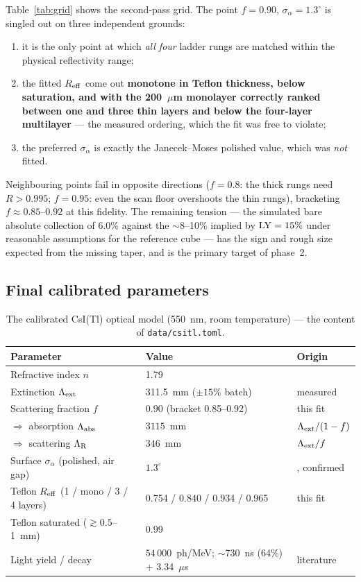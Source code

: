 \documentclass[11pt,a4paper]{article}
\newcommand{\csitl}{CsI(Tl)}
\newcommand{\lext}{\Lambda_{\rm ext}}
\newcommand{\labs}{\Lambda_{\rm abs}}
\newcommand{\lray}{\Lambda_{\rm R}}
\newcommand{\sa}{\sigma_\alpha}
\begin{document}
Table~\ref{tab:grid} shows the second-pass grid. The point $f = 0.90$,
$\sa = 1.3^\circ$ is singled out on three independent grounds:
\begin{enumerate}
  \item it is the only point at which \emph{all four} ladder rungs are matched within
    the physical reflectivity range;
  \item the fitted $R_{\rm eff}$ come out \textbf{monotone in Teflon thickness, below
    saturation, and with the 200~$\mu$m monolayer correctly ranked between one and
    three thin layers and below the four-layer multilayer} --- the measured ordering,
    which the fit was free to violate;
  \item the preferred $\sa$ is exactly the Janecek--Moses polished value, which was
    \emph{not} fitted.
\end{enumerate}
Neighbouring points fail in opposite directions ($f = 0.8$: the thick rungs need
$R > 0.995$; $f = 0.95$: even the scan floor overshoots the thin rungs), bracketing
$f \approx 0.85$--$0.92$ at this fidelity. The remaining tension --- the simulated bare
absolute collection of 6.0\% against the $\sim$8--10\% implied by ${\rm LY} = 15\%$
under reasonable assumptions for the reference cube --- has the sign and rough size
expected from the missing taper, and is the primary target of phase~2.

\subsection{Final calibrated parameters}

\begin{table}[htb]
  \centering
  \caption{The calibrated \csitl{} optical model (550~nm, room temperature) ---
  the content of \texttt{data/csitl.toml}.}
  \label{tab:final}
  \small
  \begin{tabular}{lll}
    \toprule
    Parameter & Value & Origin \\
    \midrule
    Refractive index $n$ & 1.79 & \cite{brose1998,knyazev2021} \\
    Extinction $\lext$ & 311.5~mm ($\pm15\%$ batch) & measured \cite{knyazev2021} \\
    Scattering fraction $f$ & $0.90$ (bracket 0.85--0.92) & this fit \\
    $\Rightarrow$ absorption $\labs$ & $3115$~mm & $\lext/(1-f)$ \\
    $\Rightarrow$ scattering $\lray$ & $346$~mm & $\lext/f$ \\
    Surface $\sa$ (polished, air gap) & $1.3^\circ$ & \cite{janecek2010}, confirmed \\
    Teflon $R_{\rm eff}$ (1 / mono / 3 / 4 layers) &
      0.754 / 0.840 / 0.934 / 0.965 & this fit \\
    Teflon saturated ($\gtrsim 0.5$--1~mm) & 0.99 & \cite{janecek2008} \\
    Light yield / decay & $54\,000$~ph/MeV; $\sim$730~ns (64\%) + 3.34~$\mu$s &
      literature \\
    \bottomrule
  \end{tabular}
\end{table}
\end{document}
